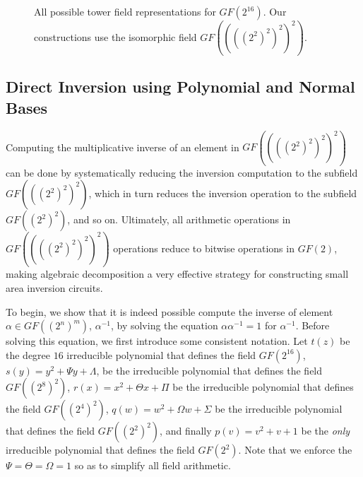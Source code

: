 \begin{figure}
\centering
{}
\caption{All possible tower field representations for $GF(2^{16})$. Our constructions use the isomorphic field $GF((((2^2)^2)^2)^2)$.}
\label{fig:gfDecompose}
\end{figure}

\subsection{Direct Inversion using Polynomial and Normal Bases}
Computing the multiplicative inverse of an element in $GF((((2^2)^2)^2)^2)$ can be done by systematically reducing the inversion computation to the subfield $GF(((2^2)^2)^2)$, which in turn reduces the inversion operation to the subfield $GF((2^2)^2)$, and so on. Ultimately, all arithmetic operations in $GF((((2^2)^2)^2)^2)$ operations reduce to bitwise operations in $GF(2)$, making algebraic decomposition a very effective strategy for constructing small area inversion circuits. 

To begin, we show that it is indeed possible compute the inverse of element $\alpha \in GF((2^n)^m)$, $\alpha^{-1}$, by solving the equation $\alpha\alpha^{-1} = 1$ for $\alpha^{-1}$. Before solving this equation, we first introduce some consistent notation. Let $t(z)$ be the degree $16$ irreducible polynomial that defines the field $GF(2^{16})$, $s(y) = y^2 + \Psi y + \Lambda$, be the irreducible polynomial that defines the field $GF((2^8)^2)$, $r(x) = x^2 + \Theta x + \Pi$ be the irreducible polynomial that defines the field $GF((2^4)^2)$, $q(w) = w^2 + \Omega w + \Sigma$ be the irreducible polynomial that defines the field $GF((2^2)^2)$, and finally $p(v) = v^2 + v + 1$ be the \emph{only} irreducible polynomial that defines the field $GF(2^2)$. Note that we enforce the $\Psi = \Theta = \Omega = 1$ so as to simplify all field arithmetic. 

